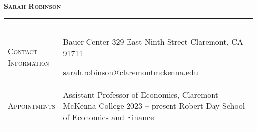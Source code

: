\documentclass[11pt]{article}
\newcommand{\xspace}{23pt}
\begin{document}
\thispagestyle{firstpage}

\begin{center}
	\vspace*{-15pt}
	{\huge\textsc{\textbf{Sarah Robinson}}} \\[2pt]
\end{center}

\vspace{-6pt}

\noindent\rule{\textwidth}{1pt}

\vspace{3pt}

\begin{tabularx}{\textwidth}{@{}Y Z@{}}
	
	\textsc{Contact \newline Information} & 
	\begin{minipage}[t]{0.28\textwidth}
		Bauer Center 329  East Ninth Street \newline
		Claremont, CA 91711
	\end{minipage}\begin{minipage}[t]{0.45\textwidth}
	 sarah.robinson@claremontmckenna.edu \newline
	 \href{https://www.s-robinson.com}{\color{blue}{www.s-robinson.com}} 
	\end{minipage}
	\\ \addlinespace[\xspace] 
	
	\textsc{Appointments} &
	Assistant Professor of Economics, Claremont McKenna College \hfill  2023 -- present%
	\vspace{3pt} \newline
	\hspace*{20pt} Robert Day School of Economics and Finance
	\\  \addlinespace[\xspace] 
	

\end{tabularx}
\end{document}
